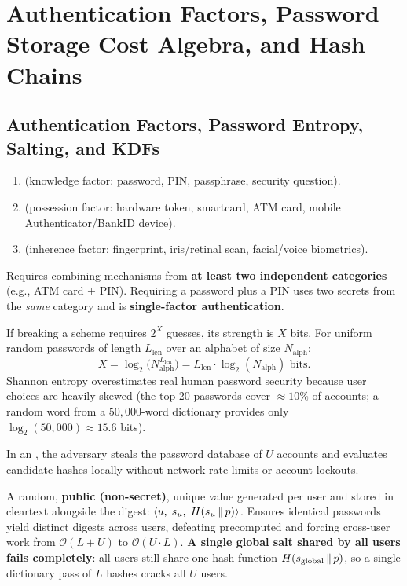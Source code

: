 \section{Authentication Factors, Password Storage Cost Algebra, and Hash Chains}

\subsection{Authentication Factors, Password Entropy, Salting, and KDFs}
\begin{compactitem}
  \item {}
  \begin{enumerate}[label=(\arabic*), leftmargin=1.8em]
    \item {} (knowledge factor: password, PIN, passphrase, security question).
    \item {} (possession factor: hardware token, smartcard, ATM card, mobile Authenticator/BankID device).
    \item {} (inherence factor: fingerprint, iris/retinal scan, facial/voice biometrics).
  \end{enumerate}
   Requires combining mechanisms from \textbf{at least two independent categories} (e.g., ATM card $+$ PIN). Requiring a password plus a PIN uses two secrets from the \emph{same} category and is \textbf{single-factor authentication}.
  \item {} If breaking a scheme requires $2^X$ guesses, its strength is $X$ bits. For uniform random passwords of length $L_{\text{len}}$ over an alphabet of size $N_{\text{alph}}$:
  \[
    X = \log_2\big(N_{\text{alph}}^{L_{\text{len}}}\big) = L_{\text{len}} \cdot \log_2(N_{\text{alph}}) \text{ bits}.
  \]
  Shannon entropy overestimates real human password security because user choices are heavily skewed (the top 20 passwords cover $\approx 10\%$ of accounts; a random word from a $50{,}000$-word dictionary provides only $\log_2(50{,}000) \approx 15.6$ bits).
  \item {}
  In an , the adversary steals the password database of $U$ accounts and evaluates candidate hashes locally without network rate limits or account lockouts.
  \begin{compactitem}
    \item {} A random, \textbf{public (non-secret)}, unique value generated per user and stored in cleartext alongside the digest: $\langle u,\; s_u,\; H(s_u \,\|\, p) \rangle$. Ensures identical passwords yield distinct digests across users, defeating precomputed  and forcing cross-user work from $\mathcal{O}(L + U)$ to $\mathcal{O}(U \cdot L)$. \textbf{A single global salt shared by all users fails completely}: all users still share one hash function $H(s_{\text{global}} \,\|\, p)$, so a single dictionary pass of $L$ hashes cracks all $U$ users.

\end{compactitem}
\end{compactitem}
